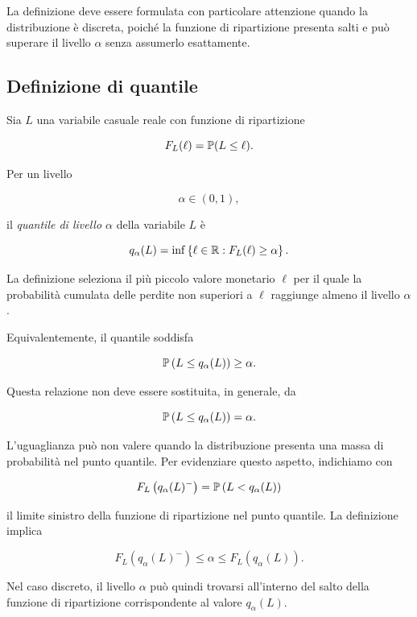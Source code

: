La definizione deve essere formulata con particolare attenzione quando
la distribuzione \`{e} discreta, poich\'{e} la funzione di ripartizione
presenta salti e pu\`{o} superare il livello $\alpha$ senza assumerlo
esattamente.

\subsection{Definizione di quantile}

\label{subsec:cap9-definizione-quantile}

Sia $L$ una variabile casuale reale con funzione di ripartizione

\[
F_L(\ell)
=
\mathbb{P}(L\leq\ell).
\]

\begin{definition}
Per un livello

\[
\alpha\in(0,1),
\]

il \emph{quantile di livello $\alpha$} della variabile $L$ \`{e}

\[
q_{\alpha}(L)
=
\inf
\left\{
\ell\in\mathbb{R}:
F_L(\ell)\geq\alpha
\right\}.
\]
\end{definition}

La definizione seleziona il pi\`{u} piccolo valore monetario
$\ell$ per il quale la probabilit\`{a} cumulata delle perdite non
superiori a $\ell$ raggiunge almeno il livello $\alpha$.

Equivalentemente, il quantile soddisfa

\[
\mathbb{P}
\left(
L\leq q_{\alpha}(L)
\right)
\geq
\alpha.
\]

Questa relazione non deve essere sostituita, in generale, da

\[
\mathbb{P}
\left(
L\leq q_{\alpha}(L)
\right)
=
\alpha.
\]

L'uguaglianza pu\`{o} non valere quando la distribuzione presenta una
massa di probabilit\`{a} nel punto quantile. Per evidenziare questo
aspetto, indichiamo con

\[
F_L\left(q_{\alpha}(L)^{-}\right)
=
\mathbb{P}
\left(
L<q_{\alpha}(L)
\right)
\]

il limite sinistro della funzione di ripartizione nel punto quantile.
La definizione implica

\[
F_L\left(q_{\alpha}(L)^{-}\right)
\leq
\alpha
\leq
F_L\left(q_{\alpha}(L)\right).
\]

Nel caso discreto, il livello $\alpha$ pu\`{o} quindi trovarsi
all'interno del salto della funzione di ripartizione corrispondente al
valore $q_{\alpha}(L)$.

